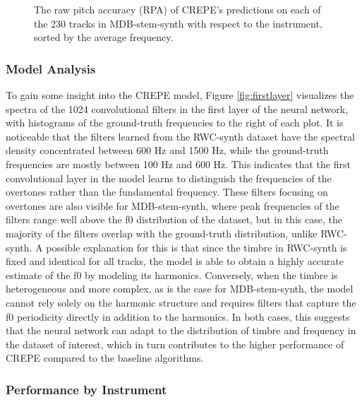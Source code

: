 \begin{figure}
\begin{minipage}{\columnwidth}
\begin{center}
		\end{center}
		\vspace{-10pt}
		\caption{
			The raw pitch accuracy (RPA) of CREPE's predictions on each of the 230 tracks in MDB-stem-synth with respect to the instrument, sorted by the average frequency.
		}
		\label{fig:per-track}
	\end{minipage}
\end{figure}


\subsubsection{Model Analysis}

To gain some insight into the CREPE model, Figure \ref{fig:firstlayer} visualizes the spectra of the 1024 convolutional filters in the first layer of the neural network, with histograms of the ground-truth frequencies to the right of each plot.
It is noticeable that the filters learned from the RWC-synth dataset have the spectral density concentrated between 600 Hz and 1500 Hz, while the ground-truth frequencies are mostly between 100 Hz and 600 Hz.
This indicates that the first convolutional layer in the model learns to distinguish the frequencies of the overtones rather than the fundamental frequency.
These filters focusing on overtones are also visible for MDB-stem-synth, where peak frequencies of the filters range well above the f0 distribution of the dataset, but in this case, the majority of the filters overlap with the ground-truth distribution, unlike RWC-synth.
A possible explanation for this is that since the timbre in RWC-synth is fixed and identical for all tracks, the model is able to obtain a highly accurate estimate of the f0 by modeling its harmonics.
Conversely, when the timbre is heterogeneous and more complex, as is the case for MDB-stem-synth, the model cannot rely solely on the harmonic structure and requires filters that capture the f0 periodicity directly in addition to the harmonics.
In both cases, this suggests that the neural network can adapt to the distribution of timbre and frequency in the dataset of interest, which in turn contributes to the higher performance of CREPE compared to the baseline algorithms.

\subsubsection{Performance by Instrument}

